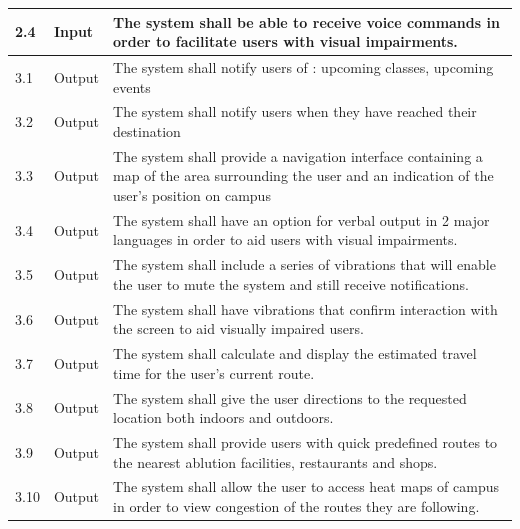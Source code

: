 \documentclass[12pt]{article}
\begin{document}
\begin{longtable}{|p{}| p{} | p{} |}
\hline

2.4& Input  & The system shall be able to receive voice commands in order to facilitate users with visual impairments.\\

\hline

3.1& Output & The system shall notify users of : upcoming classes, upcoming events\\

\hline

3.2& Output &The system shall notify users when they have reached their destination \\

\hline

3.3& Output & The system shall provide a navigation interface containing a map of the area surrounding the user and an indication of the user's position on campus\\

\hline

3.4& Output & The system shall have an option for verbal output in 2 major languages in order to aid users with visual impairments.\\

\hline

3.5& Output & The system shall include a series of vibrations that will enable the user to mute the system and still receive notifications.\\

\hline

3.6& Output & The system shall have vibrations that confirm interaction with the screen to aid visually impaired users.\\

\hline

3.7& Output & The system shall calculate and display the estimated travel time for the user's current route.\\

\hline

3.8& Output & The system shall give the user directions to the requested location both indoors and outdoors.\\

\hline

3.9& Output& The system shall provide users with quick predefined routes to the nearest ablution facilities, restaurants and shops.\\

\hline

3.10& Output& The system shall allow the user to access heat maps of campus in order to view congestion of the routes they are following.\\


\end{longtable}
\end{document}
